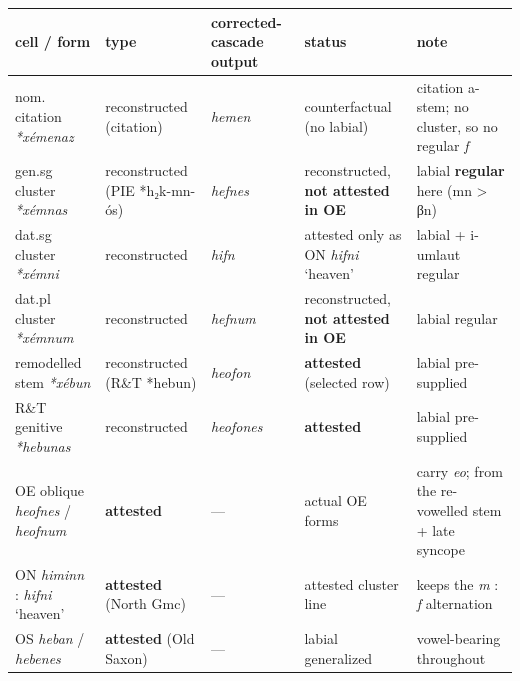 \documentclass[
  british,
  a4paper,
]{article}
\newcounter{none} %
\providecommand{\Recon}[1]{\emph{*#1}}
\begin{document}
{\def\LTcaptype{none} %
\begin{longtable}[]{@{}
  >{\raggedright\arraybackslash}p{}
  >{\raggedright\arraybackslash}p{}
  >{\raggedright\arraybackslash}p{}
  >{\raggedright\arraybackslash}p{}
  >{\raggedright\arraybackslash}p{}@{}}
\toprule\noalign{}
\begin{minipage}[b]{\linewidth}\raggedright
cell / form
\end{minipage} & \begin{minipage}[b]{\linewidth}\raggedright
type
\end{minipage} & \begin{minipage}[b]{\linewidth}\raggedright
corrected-cascade output
\end{minipage} & \begin{minipage}[b]{\linewidth}\raggedright
status
\end{minipage} & \begin{minipage}[b]{\linewidth}\raggedright
note
\end{minipage} \\
\midrule\noalign{}
\endhead
\bottomrule\noalign{}
\endlastfoot
nom. citation \Recon{xémenaz} & reconstructed (citation) &
{\emph{hemen}} & counterfactual (no labial) & citation a-stem; no
cluster, so no regular \emph{f} \\
gen.sg cluster \Recon{xémnas} & reconstructed (PIE *h₂k-mn-ós) &
{\emph{hefnes}} & reconstructed, \textbf{not attested in OE} & labial
\textbf{regular} here (mn \textgreater{} βn) \\
dat.sg cluster \Recon{xémni} & reconstructed & {\emph{hifn}} & attested
only as ON {\emph{hifni}} `heaven' & labial + i-umlaut regular \\
dat.pl cluster \Recon{xémnum} & reconstructed & {\emph{hefnum}} &
reconstructed, \textbf{not attested in OE} & labial regular \\
remodelled stem \Recon{xébun} & reconstructed (R\&T *hebun) &
{\emph{heofon}} & \textbf{attested} (selected row) & labial
pre-supplied \\
R\&T genitive \Recon{hebunas} & reconstructed & {\emph{heofones}} &
\textbf{attested} & labial pre-supplied \\
OE oblique {\emph{heofnes}} / {\emph{heofnum}} & \textbf{attested} & ---
& actual OE forms & carry \emph{eo}; from the re-vowelled stem + late
syncope \\
ON {\emph{himinn}} : {\emph{hifni}} `heaven' & \textbf{attested} (North
Gmc) & --- & attested cluster line & keeps the \emph{m} : \emph{f}
alternation \\
OS {\emph{heban}} / {\emph{hebenes}} & \textbf{attested} (Old Saxon) &
--- & labial generalized & vowel-bearing throughout \\
\end{longtable}
}
\end{document}

